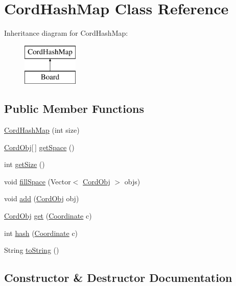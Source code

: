 \hypertarget{class_cord_hash_map}{}\section{Cord\+Hash\+Map Class Reference}
\label{class_cord_hash_map}
Inheritance diagram for Cord\+Hash\+Map\+:\begin{figure}[H]
\begin{center}
\leavevmode
\includegraphics[height=2.000000cm]{class_cord_hash_map}
\end{center}
\end{figure}
\subsection*{Public Member Functions}
\begin{DoxyCompactItemize}
\item 
\hyperlink{class_cord_hash_map_a8b7beab76c8e2048d251941158be1c65}{Cord\+Hash\+Map} (int size)
\item 
\hyperlink{class_cord_obj}{Cord\+Obj}\mbox{[}$\,$\mbox{]} \hyperlink{class_cord_hash_map_a040e3766605a4ccc046da3fe813bc7b7}{get\+Space} ()
\item 
int \hyperlink{class_cord_hash_map_ae47e8b0916e228a6ddf5c47e12ed5af8}{get\+Size} ()
\item 
void \hyperlink{class_cord_hash_map_aed7b3f290de87054d8067f0ac8bd834a}{fill\+Space} (Vector$<$ \hyperlink{class_cord_obj}{Cord\+Obj} $>$ objs)
\item 
void \hyperlink{class_cord_hash_map_ae114ae6c105e744cb7fb3a2b8b64fe0e}{add} (\hyperlink{class_cord_obj}{Cord\+Obj} obj)
\item 
\hyperlink{class_cord_obj}{Cord\+Obj} \hyperlink{class_cord_hash_map_ac1ff06929ad693e358840a7ed9d18e04}{get} (\hyperlink{class_coordinate}{Coordinate} c)
\item 
int \hyperlink{class_cord_hash_map_aed7ac5b61130a6d79ab62d00a757d387}{hash} (\hyperlink{class_coordinate}{Coordinate} c)
\item 
String \hyperlink{class_cord_hash_map_a93265a3f480c90aa63616f37b5be9998}{to\+String} ()
\end{DoxyCompactItemize}


\subsection{Constructor \& Destructor Documentation}
\hypertarget{class_cord_hash_map_a8b7beab76c8e2048d251941158be1c65}{}
